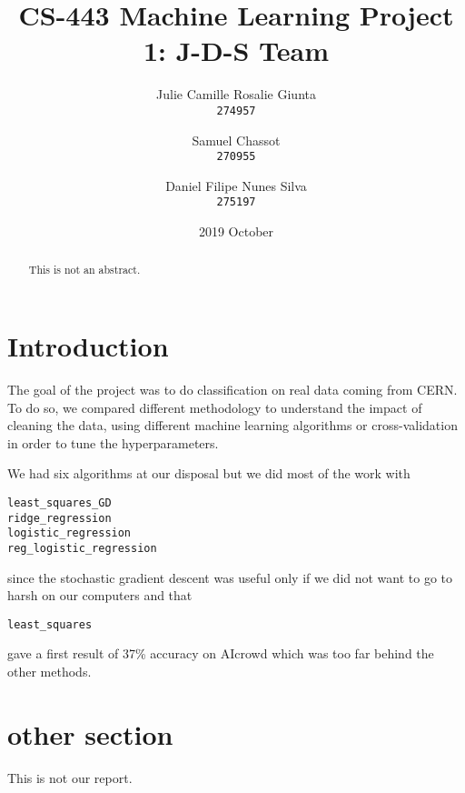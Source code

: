 \documentclass[11pt, a4paper, twoside]{article}
\begin{document}
\date{2019 October}
\title{CS-443 Machine Learning Project 1: J-D-S Team}
\author{
  Julie Camille Rosalie Giunta\\
  \texttt{274957}
  \and
  Samuel Chassot\\
  \texttt{270955}
  \and
  Daniel Filipe Nunes Silva\\
  \texttt{275197}
}

\maketitle
\clearpage

\begin{abstract}
This is not an abstract.
\end{abstract}

\section{Introduction}
The goal of the project was to do classification on real data coming from CERN. To do so, we compared different methodology to understand the impact of cleaning the data, using different machine learning algorithms or cross-validation in order to tune the hyperparameters.

We had six algorithms at our disposal but we did most of the work with 
\begin{lstlisting}
least_squares_GD 
ridge_regression
logistic_regression
reg_logistic_regression
\end{lstlisting}
since the stochastic gradient descent was useful only if we did not want to go to harsh on our computers and that
\begin{lstlisting}
least_squares
\end{lstlisting}
gave a first result of 37\% accuracy on AIcrowd which was too far behind the other methods.
 
\section{other section}
This is not our report.
\end{document}

